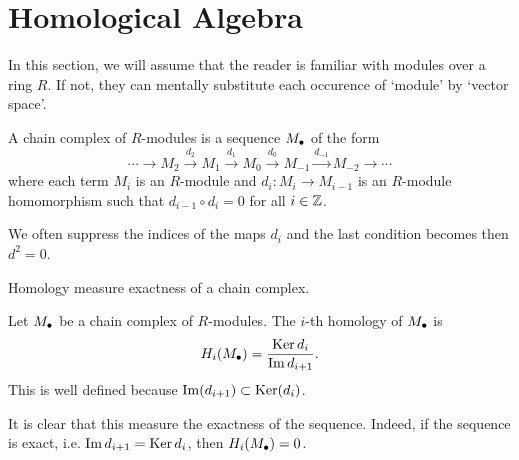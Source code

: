 

\section*{Homological Algebra}
In this section, we will assume that the reader is familiar with modules over a ring $R$. If not, they can mentally substitute each occurence of `module' by `vector space'.

\begin{definition}
    A chain complex of $R$-modules is a sequence $M_\bullet$ of the form
    \[
    \cdots \to  M_2 \xrightarrow{d_2}  M_1 \xrightarrow{d_1} M_0 \xrightarrow{d_0} M_{-1} \xrightarrow{d_{-1}}   M_{-2} \to  \cdots
    \] 
    where each term $M_i$ is an $R$-module and $d_i: M_i \to  M_{i-1}$ is an $R$-module homomorphism such that $d_{i-1}  \circ  d_i = 0$  for all $i \in \mathbb{Z}$.
\end{definition}
We often suppress the indices of the maps $d_i$ and the last condition becomes then  $d^2 = 0$.

\begin{marginfigure}
    \centering
    \caption{Homology measure exactness of a chain complex.}
    \label{fig:homology-definition}
\end{marginfigure}

\begin{definition}[Homology]
    Let $M_\bullet$ be a chain complex of  $R$-modules. The $i$-th homology of $M_\bullet$ is
     \[
         H_i(M_\bullet) = \frac{\operatorname{Ker} d_i}{\operatorname{Im} d_{i+1}}
    .\] 
    This is well defined because $\operatorname{Im}(d_{i+1}) \subset \operatorname{Ker} (d_i)$.
\end{definition}
It is clear that this measure the exactness of the sequence. Indeed, if the sequence is exact, i.e. $\operatorname{Im} d_{i+1} = \operatorname{Ker} d_i$, then $H_i(M_\bullet) = 0$.


